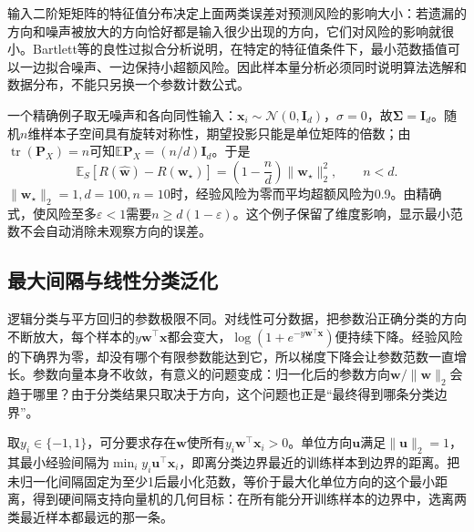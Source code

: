 输入二阶矩矩阵的特征值分布决定上面两类误差对预测风险的影响大小：若遗漏的方向和噪声被放大的方向恰好都是输入很少出现的方向，它们对风险的影响就很小。Bartlett等的良性过拟合分析说明，在特定的特征值条件下，最小范数插值可以一边拟合噪声、一边保持小超额风险。因此样本量分析必须同时说明算法选解和数据分布，不能只另换一个参数计数公式。

一个精确例子取无噪声和各向同性输入：$\bm x_i\sim\mathcal N(0,\bm I_d)$，$\sigma=0$，故$\bm\Sigma=\bm I_d$。随机$n$维样本子空间具有旋转对称性，期望投影只能是单位矩阵的倍数；由$\operatorname{tr}(\bm P_X)=n$可知$\mathbb E\bm P_X=(n/d)\bm I_d$。于是
\begin{equation}
 \mathbb E_S[R(\hat{\bm w})-R(\bm w_\star)]
 =\left(1-\frac nd\right)\|\bm w_\star\|_2^2,
 \qquad n<d.
 \label{eq:isotropic-minimum-norm-risk}
\end{equation}
$\|\bm w_\star\|_2=1,d=100,n=10$时，经验风险为零而平均超额风险为0.9。由精确式，使风险至多$\varepsilon<1$需要$n\geq d(1-\varepsilon)$。这个例子保留了维度影响，显示最小范数不会自动消除未观察方向的误差。

\subsection{最大间隔与线性分类泛化}

逻辑分类与平方回归的参数极限不同。对线性可分数据，把参数沿正确分类的方向不断放大，每个样本的$y\bm w^\top\bm x$都会变大，$\log(1+e^{-y\bm w^\top\bm x})$便持续下降。经验风险的下确界为零，却没有哪个有限参数能达到它，所以梯度下降会让参数范数一直增长。参数向量本身不收敛，有意义的问题变成：归一化后的参数方向$\bm w/\|\bm w\|_2$会趋于哪里？由于分类结果只取决于方向，这个问题也正是“最终得到哪条分类边界”。

取$y_i\in\{-1,1\}$，可分要求存在$\bm w$使所有$y_i\bm w^\top\bm x_i>0$。单位方向$\bm u$满足$\|\bm u\|_2=1$，其最小经验间隔为$\min_i y_i\bm u^\top\bm x_i$，即离分类边界最近的训练样本到边界的距离。把未归一化间隔固定为至少1后最小化范数，等价于最大化单位方向的这个最小距离，得到硬间隔支持向量机的几何目标：在所有能分开训练样本的边界中，选离两类最近样本都最远的那一条。

